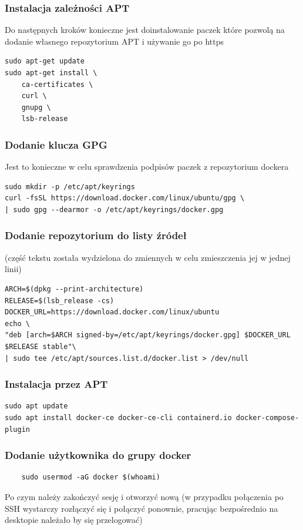 \documentclass{report}
\numberwithin{equation}{section}
\begin{document}
\subsubsection{Instalacja zależności APT}
Do następnych kroków konieczne jest doinstalowanie paczek które pozwolą na dodanie własnego repozytorium APT i używanie go po https
\begin{verbatim}
sudo apt-get update
sudo apt-get install \
    ca-certificates \
    curl \
    gnupg \
    lsb-release
\end{verbatim}
\subsubsection{Dodanie klucza GPG}
Jest to konieczne w celu sprawdzenia podpisów paczek z repozytorium dockera
\begin{verbatim}
sudo mkdir -p /etc/apt/keyrings
curl -fsSL https://download.docker.com/linux/ubuntu/gpg \
| sudo gpg --dearmor -o /etc/apt/keyrings/docker.gpg
\end{verbatim}
\begin{samepage}
    
\subsubsection{Dodanie repozytorium do listy źródeł}
(część tekstu została wydzielona do zmiennych w celu zmieszczenia jej w jednej linii)
\begin{verbatim}
ARCH=$(dpkg --print-architecture)
RELEASE=$(lsb_release -cs)
DOCKER_URL=https://download.docker.com/linux/ubuntu
echo \
"deb [arch=$ARCH signed-by=/etc/apt/keyrings/docker.gpg] $DOCKER_URL $RELEASE stable"\
| sudo tee /etc/apt/sources.list.d/docker.list > /dev/null
\end{verbatim}
\end{samepage}

\subsubsection{Instalacja przez APT}
\begin{verbatim}
sudo apt update
sudo apt install docker-ce docker-ce-cli containerd.io docker-compose-plugin
\end{verbatim}

\subsubsection{Dodanie użytkownika do grupy docker}
\begin{verbatim}
    sudo usermod -aG docker $(whoami)
\end{verbatim}
Po czym należy zakończyć sesję i otworzyć nową (w przypadku połączenia po SSH wystarczy rozłączyć się i połączyć ponownie, pracując bezpośrednio na desktopie należało by się przelogować)
\end{document}
